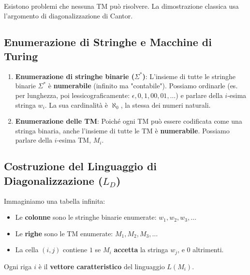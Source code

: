 \documentclass[a4paper]{article}
\theoremstyle{remark} %
\begin{document}
Esistono problemi che nessuna TM può risolvere. La dimostrazione classica usa l'argomento di diagonalizzazione di Cantor.

\subsection{Enumerazione di Stringhe e Macchine di Turing}

\begin{enumerate}
    \item \textbf{Enumerazione di stringhe binarie ($\Sigma^*$)}: L'insieme di tutte le stringhe binarie $\Sigma^*$ è \textbf{numerabile} (infinito ma "contabile"). Possiamo ordinarle (es. per lunghezza, poi lessicograficamente: $\epsilon, 0, 1, 00, 01, \dots$) e parlare della $i$-esima stringa $w_i$. La sua cardinalità è $\aleph_0$, la stessa dei numeri naturali.
    \item \textbf{Enumerazione delle TM}: Poiché ogni TM può essere codificata come una stringa binaria, anche l'insieme di tutte le TM è \textbf{numerabile}. Possiamo parlare della $i$-esima TM, $M_i$.
\end{enumerate}

\subsection{Costruzione del Linguaggio di Diagonalizzazione ($L_D$)}
Immaginiamo una tabella infinita:
\begin{itemize}
    \item Le \textbf{colonne} sono le stringhe binarie enumerate: $w_1, w_2, w_3, \dots$
    \item Le \textbf{righe} sono le TM enumerate: $M_1, M_2, M_3, \dots$
    \item La cella $(i, j)$ contiene $1$ se $M_i$ \textbf{accetta} la stringa $w_j$, e $0$ altrimenti.
\end{itemize}

Ogni riga $i$ è il \textbf{vettore caratteristico} del linguaggio $L(M_i)$.
\end{document}
